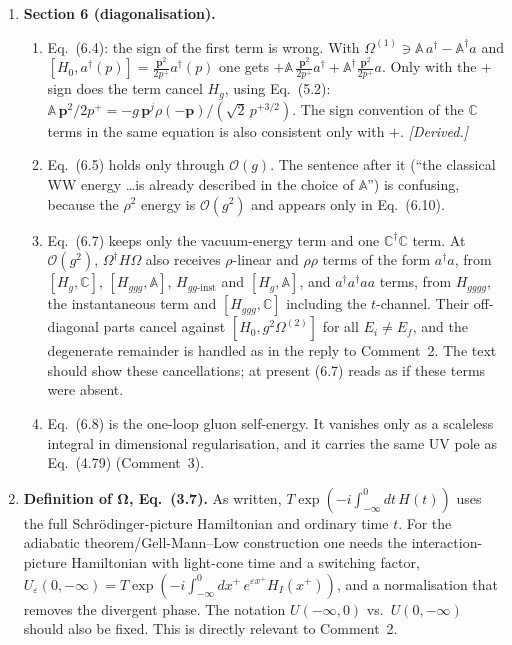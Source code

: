 \documentclass[11pt,a4paper]{article}
\newcommand{\bp}{\mathbf{p}}
\newcommand{\Hggg}{H_{ggg}}
\newcommand{\eq}[1]{Eq.~(#1)}
\begin{document}
\begin{enumerate}[label=\textbf{A\arabic*.},leftmargin=26pt,itemsep=6pt]
\item \textbf{Section 6 (diagonalisation).}
\begin{enumerate}[label=(\alph*),itemsep=2pt]
\item \eq{6.4}: the sign of the first term is wrong. With $\Omega^{(1)}\ni\mathbb A\,a^\dagger-\mathbb A^\dagger a$ and $[H_0,a^\dagger(p)]=\tfrac{\bp^2}{2p^+}a^\dagger(p)$ one gets $+\mathbb A\,\frac{\bp^2}{2p^+}a^\dagger+\mathbb A^\dagger\frac{\bp^2}{2p^+}a$. Only with the $+$ sign does the term cancel $H_g$, using \eq{5.2}: $\mathbb A\,\bp^2/2p^+=-g\,\bp^j\rho(-\bp)/(\sqrt2\,p^{+3/2})$. The sign convention of the $\mathbb C$ terms in the same equation is also consistent only with $+$. \emph{[Derived.]}
\item \eq{6.5} holds only through $\mathcal O(g)$. The sentence after it (``the classical WW energy \dots is already described in the choice of $\mathbb A$'') is confusing, because the $\rho^2$ energy is $\mathcal O(g^2)$ and appears only in \eq{6.10}.
\item \eq{6.7} keeps only the vacuum-energy term and one $\mathbb C^\dagger\mathbb C$ term. At $\mathcal O(g^2)$, $\Omega^\dagger H\Omega$ also receives $\rho$-linear and $\rho\rho$ terms of the form $a^\dagger a$, from $[H_g,\mathbb C]$, $[\Hggg,\mathbb A]$, $H_{gg\text{-inst}}$ and $[H_g,\mathbb A]$, and $a^\dagger a^\dagger a a$ terms, from $H_{gggg}$, the instantaneous term and $[\Hggg,\mathbb C]$ including the $t$-channel. Their off-diagonal parts cancel against $[H_0,g^2\Omega^{(2)}]$ for all $E_i\neq E_f$, and the degenerate remainder is handled as in the reply to Comment~2. The text should show these cancellations; at present (6.7) reads as if these terms were absent.
\item \eq{6.8} is the one-loop gluon self-energy. It vanishes only as a scaleless integral in dimensional regularisation, and it carries the same UV pole as \eq{4.79} (Comment~3).
\end{enumerate}

\item \textbf{Definition of Ω, \eq{3.7}.} As written, $T\exp(-i\int_{-\infty}^0dt\,H(t))$ uses the full Schr\"odinger-picture Hamiltonian and ordinary time $t$. For the adiabatic theorem/Gell-Mann--Low construction one needs the interaction-picture Hamiltonian with light-cone time and a switching factor, $U_\varepsilon(0,-\infty)=T\exp(-i\int_{-\infty}^0dx^+\,e^{\varepsilon x^+}H_{I}(x^+))$, and a normalisation that removes the divergent phase. The notation $U(-\infty,0)$ vs.\ $U(0,-\infty)$ should also be fixed. This is directly relevant to Comment~2.


\end{enumerate}
\end{document}
